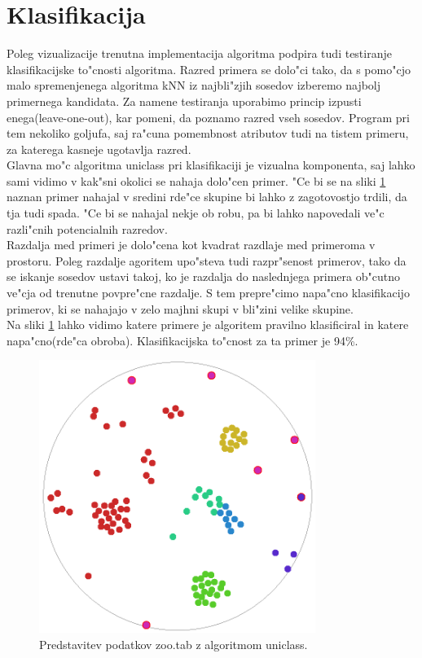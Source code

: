 \documentclass[a4paper]{article}
\begin{document}
\section{Klasifikacija}
	Poleg vizualizacije trenutna implementacija algoritma podpira tudi testiranje klasifikacijske to"cnosti algoritma. Razred primera se dolo"ci tako, da s pomo"cjo malo spremenjenega algoritma kNN iz najbli"zjih sosedov izberemo najbolj primernega kandidata. Za namene testiranja uporabimo princip izpusti enega(leave-one-out), kar pomeni, da poznamo razred vseh sosedov. Program pri tem nekoliko goljufa, saj ra"cuna pomembnost atributov tudi na tistem primeru, za katerega kasneje ugotavlja razred. \\
	Glavna mo"c algoritma uniclass pri klasifikaciji je vizualna komponenta, saj lahko sami vidimo v kak"sni okolici se nahaja dolo"cen primer. "Ce bi se na sliki \ref{f-zoo} naznan primer nahajal v sredini rde"ce skupine bi lahko z zagotovostjo trdili, da tja tudi spada. "Ce bi se nahajal nekje ob robu, pa bi lahko napovedali ve"c razli"cnih potencialnih razredov.\\
	Razdalja med primeri je dolo"cena kot kvadrat razdlaje med primeroma v prostoru. Poleg razdalje agoritem upo"steva tudi razpr"senost primerov, tako da se iskanje sosedov ustavi takoj, ko je razdalja do naslednjega primera ob"cutno ve"cja od trenutne povpre"cne razdalje. S tem prepre"cimo napa"cno klasifikacijo primerov, ki se nahajajo v zelo majhni skupi v bli"zini velike skupine. \\
	Na sliki \ref{f-zoo} lahko vidimo katere primere je algoritem pravilno klasificiral in katere napa"cno(rde"ca obroba). Klasifikacijska to"cnost za ta primer je 94\%.

	\begin{figure}[H]
	\begin{center}
	\includegraphics[width=0.8\textwidth]{img/zoo_uniclass.png}
	\end{center}
	\caption{Predstavitev podatkov zoo.tab z algoritmom uniclass.}
	\label{f-zoo}
	\end{figure}
	
\end{document}
